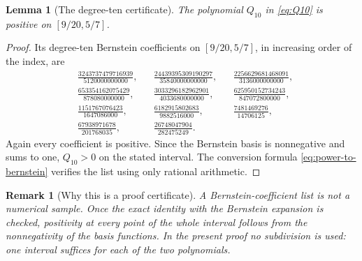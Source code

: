 \documentclass[11pt]{article}
\newtheorem{lemma}[theorem]{Lemma}
\newtheorem{remark}[theorem]{Remark}
\begin{document}
\begin{lemma}[The degree-ten certificate]\label{lem:bernstein-Q10}
The polynomial \(Q_{10}\) in \eqref{eq:Q10} is positive on
\([9/20,5/7]\).
\end{lemma}

\begin{proof}
Its degree-ten Bernstein coefficients on \([9/20,5/7]\), in increasing
order of the index, are
\begin{align*}
 &\frac{3243737479716939}{5120000000000},
 &&\frac{24439395309190297}{35840000000000},
 &&\frac{2256629681468091}{3136000000000},\\[1mm]
 &\frac{653354162075429}{878080000000},
 &&\frac{3033296182962901}{4033680000000},
 &&\frac{625950152734243}{847072800000},\\[1mm]
 &\frac{1151767076423}{1647086000},
 &&\frac{6182915802683}{9882516000},
 &&\frac{7481469276}{14706125},\\[1mm]
 &\frac{67938971678}{201768035},
 &&\frac{26748047904}{282475249}.
\end{align*}
Again every coefficient is positive.  Since the Bernstein basis is
nonnegative and sums to one, \(Q_{10}>0\) on the stated interval.
The conversion formula \eqref{eq:power-to-bernstein} verifies the list using
only rational arithmetic.
\end{proof}

\begin{remark}[Why this is a proof certificate]
A Bernstein-coefficient list is not a numerical sample.  Once the exact
identity with the Bernstein expansion is checked, positivity at every point
of the whole interval follows from the nonnegativity of the basis functions.
In the present proof no subdivision is used: one interval suffices for each
of the two polynomials.
\end{remark}
\end{document}
